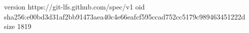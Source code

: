version https://git-lfs.github.com/spec/v1
oid sha256:e00bd3d31af2bb91473aea40c4e66eafcf595ccad752cc5179c989463451222d
size 1819
